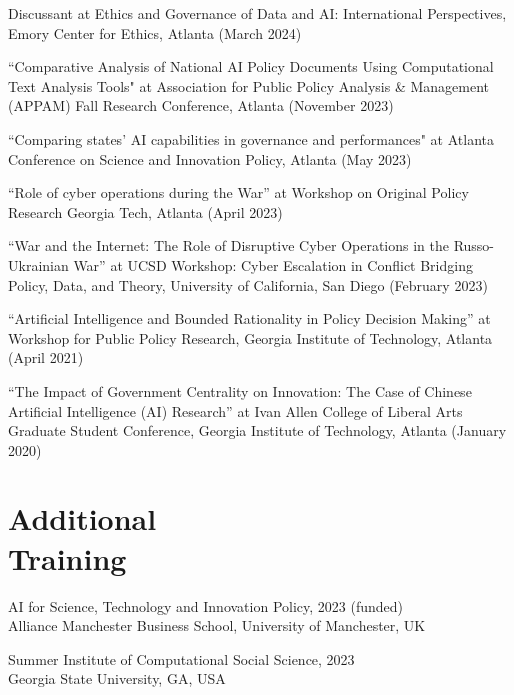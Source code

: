 \documentclass[margin,line, 10pt]{res}
\begin{document}
\begin{resume}
Discussant at Ethics and Governance of Data and AI: International Perspectives, Emory Center for Ethics, Atlanta (March 2024)
\vspace{-.1cm}

“Comparative Analysis of National AI Policy Documents Using Computational Text Analysis Tools" at Association for Public Policy Analysis \& Management (APPAM) Fall Research Conference, Atlanta (November 2023)
\vspace{-.1cm}

“Comparing states’ AI capabilities in governance and performances" at Atlanta Conference on Science and Innovation Policy, Atlanta (May 2023)
\vspace{-.1cm}

“Role of cyber operations during the War” at Workshop on Original Policy Research Georgia Tech, Atlanta (April 2023)
\vspace{-.1cm}

“War and the Internet: The Role of Disruptive Cyber Operations in the Russo-Ukrainian War” at UCSD Workshop: Cyber Escalation in Conflict Bridging Policy, Data, and Theory, University of California, San Diego (February 2023)
\vspace{-.1cm}

“Artificial Intelligence and Bounded Rationality in Policy Decision Making” at Workshop for Public Policy Research, Georgia Institute of Technology, Atlanta (April 2021)
\vspace{-.1cm}

“The Impact of Government Centrality on Innovation: The Case of Chinese Artificial Intelligence (AI) Research” at Ivan Allen College of Liberal Arts Graduate Student Conference, Georgia Institute of Technology, Atlanta (January 2020)
\vspace{-.1cm}


\section{\sc Additional\\Training}
AI for Science, Technology and Innovation Policy, 2023 (funded)\\
Alliance Manchester Business School, University of Manchester, UK

Summer Institute of Computational Social Science, 2023\\
Georgia State University, GA, USA


\end{resume}
\end{document}

